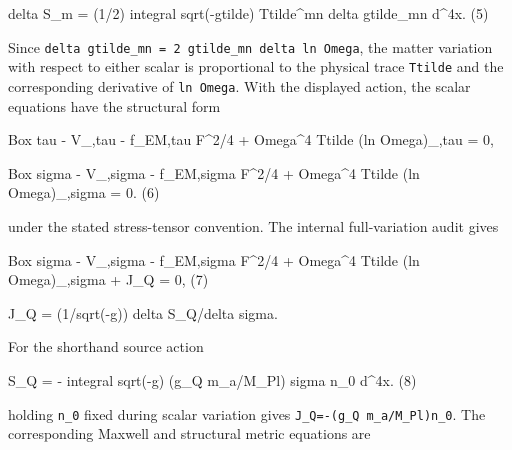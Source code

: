 \documentclass[
  american,
  11pt,
  letterpaper,
]{article}
\newenvironment{Shaded}{}{}
\newcommand{\NormalTok}[1]{#1}
\begin{document}
\begin{Shaded}
\begin{Highlighting}[]
\NormalTok{delta S\_m = (1/2) integral sqrt({-}gtilde)}
\NormalTok{            Ttilde\^{}mn delta gtilde\_mn d\^{}4x.                     (5)}
\end{Highlighting}
\end{Shaded}

Since \texttt{delta\ gtilde\_mn\ =\ 2\ gtilde\_mn\ delta\ ln\ Omega}, the matter variation with respect to either scalar is proportional to the physical trace \texttt{Ttilde} and the corresponding derivative of \texttt{ln\ Omega}. With the displayed action, the scalar equations have the structural form

\begin{Shaded}
\begin{Highlighting}[]
\NormalTok{Box tau {-} V\_,tau {-} f\_EM,tau F\^{}2/4}
\NormalTok{  + Omega\^{}4 Ttilde (ln Omega)\_,tau = 0,}

\NormalTok{Box sigma {-} V\_,sigma {-} f\_EM,sigma F\^{}2/4}
\NormalTok{  + Omega\^{}4 Ttilde (ln Omega)\_,sigma = 0.                       (6)}
\end{Highlighting}
\end{Shaded}

under the stated stress-tensor convention. The internal full-variation audit gives

\begin{Shaded}
\begin{Highlighting}[]
\NormalTok{Box sigma {-} V\_,sigma {-} f\_EM,sigma F\^{}2/4}
\NormalTok{  + Omega\^{}4 Ttilde (ln Omega)\_,sigma + J\_Q = 0,                 (7)}

\NormalTok{J\_Q = (1/sqrt({-}g)) delta S\_Q/delta sigma.}
\end{Highlighting}
\end{Shaded}

For the shorthand source action

\begin{Shaded}
\begin{Highlighting}[]
\NormalTok{S\_Q = {-} integral sqrt({-}g) (g\_Q m\_a/M\_Pl) sigma n\_0 d\^{}4x.        (8)}
\end{Highlighting}
\end{Shaded}

holding \texttt{n\_0} fixed during scalar variation gives \texttt{J\_Q=-(g\_Q\ m\_a/M\_Pl)n\_0}. The corresponding Maxwell and structural metric equations are
\end{document}
